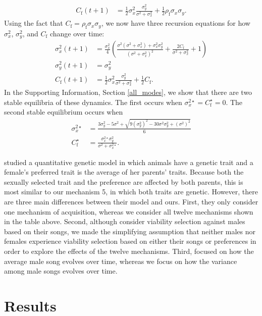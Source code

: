 \documentclass[12pt]{article}
\newcommand{\x}[1]{\text{#1}}
\begin{document}
\begin{align*}
C_\x{f}(t+1)&=\frac{1}{2}\sigma_{x}^2\frac{\sigma_{y}^2}{\sigma^2+\sigma_{x}^2}+\frac{1}{2}\rho_\x{f}\sigma_{x}\sigma_{y}.
\end{align*} 
Using the fact that $C_\x{f}=\rho_\x{f}\sigma_{x}\sigma_{y}$, we now have three recursion equations for how $\sigma_{x}^2$, $\sigma_{y}^2$, and $C_\x{f}$ change over time:
\begin{align*}
\sigma_x^2(t+1)&=\frac{\sigma_x^2}{4}\left(\frac{\sigma^2(\sigma^2+\sigma_{x}^2)+\sigma_{x}^2\sigma_{y}^2}{(\sigma^2+\sigma_{x}^2)^2}+\frac{2C_\x{f}}{\sigma^2+\sigma_x^2}+1\right)
\\ \sigma_y^2(t+1)&=\sigma_y^2
\\ C_\x{f}(t+1)&=\frac{1}{2}\sigma_{x}^2\frac{\sigma_{y}^2}{\sigma^2+\sigma_{x}^2}+\frac{1}{2}C_\x{f}.
\end{align*}
In the Supporting Information, Section \ref{all_modes}, we show that there are two stable equilibria of these dynamics. The first occurs when $\sigma_x^{2\star}=C_\x{f}^\star=0$. The second stable equilibrium occurs when
\begin{align*}
\sigma_x^{2\star}&=\frac{3\sigma_y^2-5\sigma^2+\sqrt{9(\sigma_y^2)^2-30\sigma^2\sigma_y^2+(\sigma^2)^2}}{6}
\\ C_\x{f}^\star&=\frac{\sigma_x^{2\star}\sigma_y^2}{\sigma^2+\sigma_x^{2\star}}.
\end{align*}

\citet{Aoki:2001ly} studied a quantitative genetic model in which animals have a genetic trait and a female's preferred trait is the average of her parents' traits. Because both the sexually selected trait and the preference are affected by both parents, this is most similar to our mechanism 5, in which both traits are genetic. However, there are three main differences between their model and ours. First, they only consider one mechanism of acquisition, whereas we consider all twelve mechanisms shown in the table above. Second, although \citet{Aoki:2001ly} consider viability selection against males based on their songs, we made the simplifying assumption that neither males nor females experience viability selection based on either their songs or preferences in order to explore the effects of the twelve mechanisms. Third, \citet{Aoki:2001ly} focused on how the average male song evolves over time, whereas we focus on how the variance among male songs evolves over time.


\section*{Results}
\end{document}
